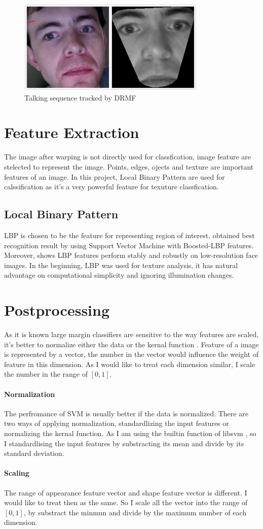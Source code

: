 \begin{figure}[ht]
\centering
\includegraphics[width=90mm]{imgs/Warping_Intraface_213.png}
\caption{Talking sequence tracked by DRMF}
\end{figure}
\newpage
\section{Feature Extraction}
The image after warping is not directly used for classfication, image feature are stelected to represent the image. Points, edges, ojects and texture are important features of an image. In this project, Local Binary Pattern are used for calssification as it's a very powerful feature for texuture classfication. 
\subsection{Local Binary Pattern}
LBP is chosen to be the feature for representing region of interest. \cite{shan2009facial} obtained best recognition result by using Support Vector Machine with Boosted-LBP features. Moreover, \cite{shan2009facial} shows LBP features perform stably and robustly on low-resolution face images. In the beginning, LBP was used for texture analysis, it has natural advantage on computational simplicity and ignoring illumination changes.
\newpage
\section{Postprocessing}
As it is known large margin classifiers are sensitive to the way features are scaled, it's better to normalize either the data or the kernal function \cite{ben2010user}. Feature of a image is represented by a vector, the number in the vector would influence the weight of feature in this dimension. As I would like to treat each dimension similar, I scale the number in the range of $[0,1]$.
\paragraph{Normalization}
The perfromance of SVM is usually better if the data is normalized. There are two ways of applying normalization, standardlizing the input features or normalizing the kernal function. As I am using the builtin function of libsvm \cite{CC01a}, so I standardlising the input features by substracting its mean and divide by its standard deviation.
\paragraph{Scaling}
The range of appearance feature vector and shape feature vector is different. I would like to treat then as the same. So I scale all the vector into the range of $[0, 1]$, by substract the minmun and divide by the maximum number of each dimension.